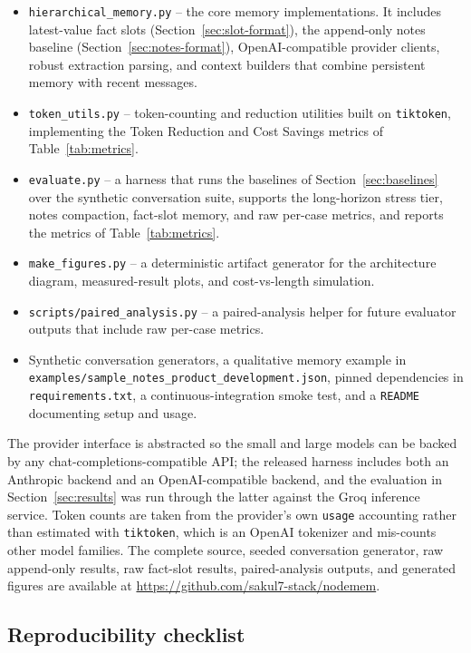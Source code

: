 \documentclass[conference]{IEEEtran}
\begin{document}
\begin{itemize}
    \item \texttt{hierarchical\_memory.py} -- the core memory implementations. It includes latest-value fact slots (Section~\ref{sec:slot-format}), the append-only notes baseline (Section~\ref{sec:notes-format}), OpenAI-compatible provider clients, robust extraction parsing, and context builders that combine persistent memory with recent messages.
    \item \texttt{token\_utils.py} -- token-counting and reduction utilities built on \texttt{tiktoken}, implementing the Token Reduction and Cost Savings metrics of Table~\ref{tab:metrics}.
    \item \texttt{evaluate.py} -- a harness that runs the baselines of Section~\ref{sec:baselines} over the synthetic conversation suite, supports the long-horizon stress tier, notes compaction, fact-slot memory, and raw per-case metrics, and reports the metrics of Table~\ref{tab:metrics}.
    \item \texttt{make\_figures.py} -- a deterministic artifact generator for the architecture diagram, measured-result plots, and cost-vs-length simulation.
    \item \texttt{scripts/paired\_analysis.py} -- a paired-analysis helper for future evaluator outputs that include raw per-case metrics.
    \item Synthetic conversation generators, a qualitative memory example in \texttt{examples/sample\_notes\_product\_development.json}, pinned dependencies in \texttt{requirements.txt}, a continuous-integration smoke test, and a \texttt{README} documenting setup and usage.
\end{itemize}

The provider interface is abstracted so the small and large models can be backed by any chat-completions-compatible API; the released harness includes both an Anthropic backend and an OpenAI-compatible backend, and the evaluation in Section~\ref{sec:results} was run through the latter against the Groq inference service. Token counts are taken from the provider's own \texttt{usage} accounting rather than estimated with \texttt{tiktoken}, which is an OpenAI tokenizer and mis-counts other model families. The complete source, seeded conversation generator, raw append-only results, raw fact-slot results, paired-analysis outputs, and generated figures are available at \url{https://github.com/sakul7-stack/nodemem}.

\subsection{Reproducibility checklist}
\end{document}
